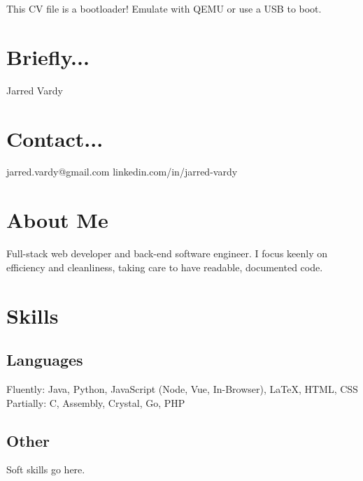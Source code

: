 \documentclass[]{jvcv}
\begin{document}
       {This CV file is a bootloader! Emulate with QEMU or use a USB to boot.}



%
\begin{aside}
	\section{Briefly...}\vspace{0.1cm}
	Jarred Vardy
	\section{Contact...}\vspace{0.1cm}
	jarred.vardy@gmail.com
	linkedin.com/in/jarred-vardy
\end{aside}

%
\section{About Me}
Full-stack web developer and back-end software engineer.
I focus keenly on efficiency and cleanliness, taking care to have readable, documented code.


%
\vspace{0.5cm}
\section{Skills}
\subsection{Languages}
Fluently: Java, Python, JavaScript (Node, Vue, In-Browser), LaTeX, HTML, CSS\\
Partially: C, Assembly, Crystal, Go, PHP

\vspace{0.1cm}
\subsection{Other}
Soft skills go here.

%
\vspace{0.5cm}
\end{document}
